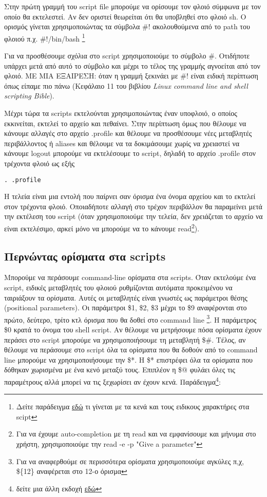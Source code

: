 Στην πρώτη γραμμή του script file μπορούμε να ορίσουμε τον φλοιό σύμφωνα με τον οποίο θα εκτελεστεί. Αν δεν οριστεί θεωρείται ότι θα
υποβληθεί στο φλοιό sh. Ο ορισμός γίνεται χρησιμοποιώντας τα σύμβολα \#! ακολουθούμενα από το path του φλοιού π.χ. \#!/bin/bash \footnote{Δείτε παράδειγμα \href{http://steve-parker.org/sh/first.shtml}{εδώ} τι γίνεται με τα κενά και τους ειδικους χαρακτήρες στα scipt}

Για να προσθέσουμε σχόλια στο script χρησιμοποιούμε το σύμβολο \#. Οτιδήποτε υπάρχει μετά από αυτό το σύμβολο και μέχρι το τέλος της γραμμής
αγνοείται από τον φλοιό. ΜΕ ΜΙΑ ΕΞΑΙΡΕΣΗ: όταν η γραμμή ξεκινάει με \#! είναι ειδική περίπτωση όπως είπαμε πιο πάνω (Κεφάλαιο 11 του βιβλίου \emph{Linux command line and shell scripting Βible}\cite{blum2008linux}).

Μέχρι τώρα τα scripts εκτελούνται χρησιμοποιώντας έναν υποφλοιό, ο οποίος εκκινείται, εκτελεί το αρχείο και πεθαίνει. Στην περίπτωση όμως
που θέλουμε να κάνουμε αλλαγές στο αρχείο .profile και θέλουμε να προσθέσουμε νέες μεταβλητές περιβάλλοντος ή aliases και θέλουμε να τα
δοκιμάσουμε χωρίς να χρειαστεί να κάνουμε logout μπορούμε να εκτελέσουμε το script, δηλαδή το αρχείο .profile στον τρέχοντα φλοιό ως εξής
\begin{lstlisting}
. .profile
\end{lstlisting}

Η τελεία είναι μια εντολή που παίρνει σαν όρισμα ένα όνομα αρχείου και το εκτελεί στον τρέχοντα φλοιό. Οποιαδήποτε
αλλαγή στο τρέχον περιβάλλον θα παραμείνει μετά την εκτέλεση του script (όταν χρησιμοποιούμε την τελεία, δεν χρειάζεται το αρχείο να είναι
εκτελέσιμο, αρκεί μόνο να μπορούμε να το κάνουμε read\footnote{Για να έχουμε auto-completion με τη read και να εμφανίσουμε και μήνυμα στο χρήστη, χρησιμοποιούμε την read -e -p "Give a parameter"}).


\subsection*{Περνώντας ορίσματα στα scripts}

Μπορούμε να περάσουμε command-line ορίσματα στα scripts. Όταν εκτελούμε ένα script, ειδικές μεταβλητές του φλοιού ρυθμίζονται αυτόματα
προκειμένου να ταιριάξουν τα ορίσματα. Αυτές οι μεταβλητές είναι γνωστές ως παράμετροι θέσης (positional parameters). Οι παράμετροι \$1,
\$2, \$3 μέχρι το \$9 αναφέρονται στο πρώτο, δεύτερο, τρίτο κτλ όρισμα που θα δοθεί στο command line \footnote{Για να αναφερθούμε σε
	περισσότερα ορίσματα χρησιμοποιούμε αγκύλες π,χ, \$\{12\} αναφέρεται στο 12-ο όρισμα}. Η παράμετρος \$0 κρατά το όνομα του shell script. Αν
θέλουμε να μετρήσουμε πόσα ορίσματα έχουν περάσει στο script μπορούμε να χρησιμοποιήσουμε τη μεταβλητή \$\#. Τέλος, αν θέλουμε να περάσουμε
στο script όλα τα ορίσματα που θα δοθούν από το command line μπορούμε να χρησιμοποιήσουμε την \$*. H \$* επιστρέφει όλα τα ορίσματα που
δόθηκαν χωρισμένα με ένα κενό μεταξύ τους. Επιπλέον η \$@ φυλάει όλες τις παραμέτρους αλλά μπορεί να τις ξεχωρίσει αν έχουν κενά. Παράδειγμα\footnote{δείτε μια άλλη εκδοχή \href{http://www.dartmouth.edu/~rc/classes/ksh/ex7.txt}{εδώ}}:

